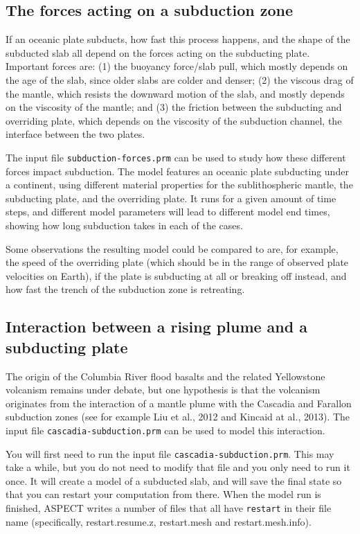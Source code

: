 \documentclass[notitlepage]{article}
\begin{document}
\subsection{The forces acting on a subduction zone}

If an oceanic plate subducts, how fast this process happens, and the shape of the subducted slab all depend on the forces acting on the subducting plate. Important forces are: (1) the buoyancy force/slab pull, which mostly depends on the age of the slab, since older slabs are colder and denser; (2) the viscous drag of the mantle, which resists the downward motion of the slab, and mostly depends on the viscosity of the mantle; and (3) the friction between the subducting and overriding plate, which depends on the viscosity of the subduction channel, the interface between the two plates. 

The input file \texttt{subduction-forces.prm} can be used to study how these different forces impact subduction. The model features an oceanic plate subducting under a continent, using different material properties for the sublithospheric mantle, the subducting plate, and the overriding plate. It runs for a given amount of time steps, and different model parameters will lead to different model end times, showing how long subduction takes in each of the cases. 

Some observations the resulting model could be compared to are, for example, the speed of the overriding plate (which should be in the range of observed plate velocities on Earth), if the plate is subducting at all or breaking off instead, and how fast the trench of the subduction zone is retreating.  

\subsection{Interaction between a rising plume and a subducting plate}

The origin of the Columbia River flood basalts and the related Yellowstone volcanism remains under debate, 
but one hypothesis is that the volcanism originates from the interaction of a mantle plume with the 
Cascadia and Farallon subduction zones (see for example Liu et al., 2012 and Kincaid at al., 2013). 
The input file \texttt{cascadia-subduction.prm} can be used to model this interaction. 

You will first need to run the input file \texttt{cascadia-subduction.prm}. This may take a while, but you
do not need to modify that file and you only need to run it once. 
It will create a model of a subducted slab, and will save the final state so that 
you can restart your computation from there. When the model run is finished, ASPECT writes a number of files 
that all have \texttt{restart} in their file name (specifically, restart.resume.z, restart.mesh and restart.mesh.info). 
\end{document}
